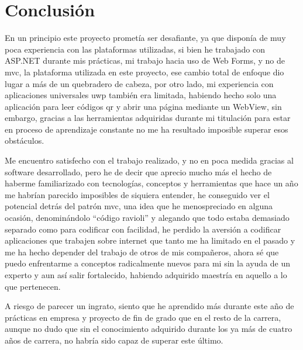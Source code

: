 \chapter{Conclusión}

En un principio este proyecto prometía ser desafiante, ya que disponía de muy poca experiencia con las plataformas utilizadas, si bien he trabajado con ASP.NET durante mis prácticas, mi trabajo hacia uso de Web Forms, y no de \acrshort{mvc}, la plataforma utilizada en este proyecto, ese cambio total de enfoque dio lugar a más de un quebradero de cabeza, por otro lado, mi experiencia con aplicaciones universales \acrshort{uwp} también era limitada, habiendo hecho solo una aplicación para leer códigos \acrshort{qr} y abrir una página mediante un WebView, sin embargo, gracias a las herramientas adquiridas durante mi titulación para estar en proceso de aprendizaje constante no me ha resultado imposible superar esos obstáculos.

Me encuentro satisfecho con el trabajo realizado, y no en poca medida gracias al software desarrollado, pero he de decir que aprecio mucho más el hecho de haberme familiarizado con tecnologías, conceptos y herramientas que hace un año me habrían parecido imposibles de siquiera entender, he conseguido ver el potencial detrás del patrón \acrshort{mvc}, una idea que he menospreciado en alguna ocasión, denominándolo ``código ravioli'' y alegando que todo estaba demasiado separado como para codificar con facilidad, he perdido la aversión a codificar aplicaciones que trabajen sobre internet que tanto me ha limitado en el pasado y me ha hecho depender del trabajo de otros de mis compañeros, ahora sé que puedo enfrentarme a conceptos radicalmente nuevos para mi sin la ayuda de un experto y aun así salir fortalecido, habiendo adquirido maestría en aquello a lo que pertenecen.

A riesgo de parecer un ingrato, siento que he aprendido más durante este año de prácticas en empresa y proyecto de fin de grado que en el resto de la carrera, aunque no dudo que sin el conocimiento adquirido durante los ya más de cuatro años de carrera, no habría sido capaz de superar este último.
